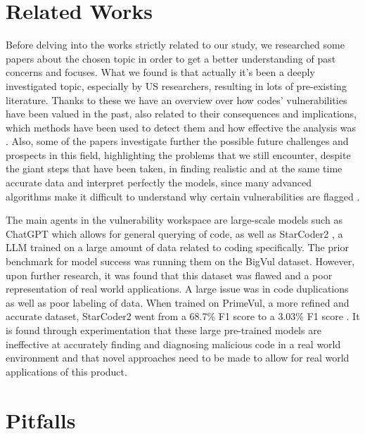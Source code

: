 \documentclass{article}
\begin{document}
\section{Related Works}

Before delving into the works strictly related to our study, we researched some papers about the chosen topic in order to get a better understanding of past concerns and focuses. What we found is that actually it’s been a deeply investigated topic, especially by US researchers, resulting in lots of pre-existing literature. Thanks to these we have an overview over how codes’ vulnerabilities have been valued in the past, also related to their consequences and implications, which methods have been used to detect them and how effective the analysis was \cite{LIANG2025104098}. Also, some of the papers investigate further the possible future challenges and prospects in this field, highlighting the problems that we still encounter, despite the giant steps that have been taken, in finding realistic and at the same time accurate data and interpret perfectly the models, since many advanced algorithms make it difficult to understand why certain vulnerabilities are flagged \cite{harer2018automatedsoftwarevulnerabilitydetection}.

The main agents in the vulnerability workspace are large-scale models such as ChatGPT \cite{openai2024gpt4} which allows for general querying of code, as well as StarCoder2 \cite{lozhkov2024starcoder2stackv2}, a LLM trained on a large amount of data related to coding specifically. The prior benchmark for model success was running them on the BigVul dataset. However, upon further research, it was found that this dataset was flawed and a poor representation of real world applications. A large issue was in code duplications as well as poor labeling of data. When trained on PrimeVul, a more refined and accurate dataset, StarCoder2 went from a 68.7\% F1 score to a 3.03\% F1 score \cite{ding2024vulnerabilitydetectioncodelanguage}. It is found through experimentation that these large pre-trained models are ineffective at accurately finding and diagnosing malicious code in a real world environment and that novel approaches need to be made to allow for real world applications of this product. \cite{ding2024vulnerabilitydetectioncodelanguage}

\section{Pitfalls}
\end{document}
